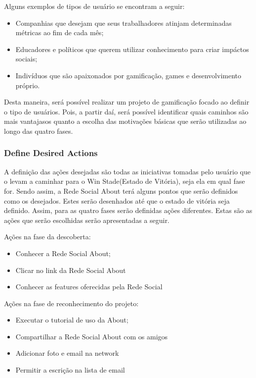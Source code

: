 Alguns exemplos de tipos de usuário se encontram a seguir:

\begin{itemize}
    \item Companhias que desejam que seus trabalhadores atinjam determinadas métricas
        ao fim de cada mês;
    \item Educadores e políticos que querem utilizar conhecimento para criar impáctos
        sociais;
    \item Indivíduos que são apaixonados por gamificação, games e desenvolvimento próprio.
\end{itemize}
 
Desta maneira, será possível realizar um projeto de gamificação focado ao definir o tipo
de usuários. Pois, a partir daí, será possível identificar quais caminhos são mais vantajasos
quanto a escolha das motivações básicas que serão utilizadas ao longo das quatro fases.

\subsubsection{Define Desired Actions}
\label{sub:define_desired_actions}
A definição das ações desejadas são todas as iniciativas tomadas pelo usuário que o 
levam a caminhar para
o Win Stade(Estado de Vitória), seja ela em qual fase for. Sendo assim, a Rede Social
About terá alguns pontos que serão definidos como os desejados. Estes serão desenhados
até que o estado de vitória seja definido. Assim, para as quatro fases serão definidas
ações diferentes. Estas são as  ações que serão escolhidas serão apresentadas
a seguir.

Ações na fase da descoberta:
\begin{itemize}
    \item Conhecer a Rede Social About;
    \item Clicar no link da Rede Social About
    \item Conhecer as features oferecidas pela Rede Social
\end{itemize}


Ações na fase de reconhecimento do projeto: 
\begin{itemize}
    \item Executar o tutorial de uso da About;
    \item Compartilhar a Rede Social About com os amigos
    \item Adicionar foto e email na network
    \item Permitir a escrição na lista de email
\end{itemize}

